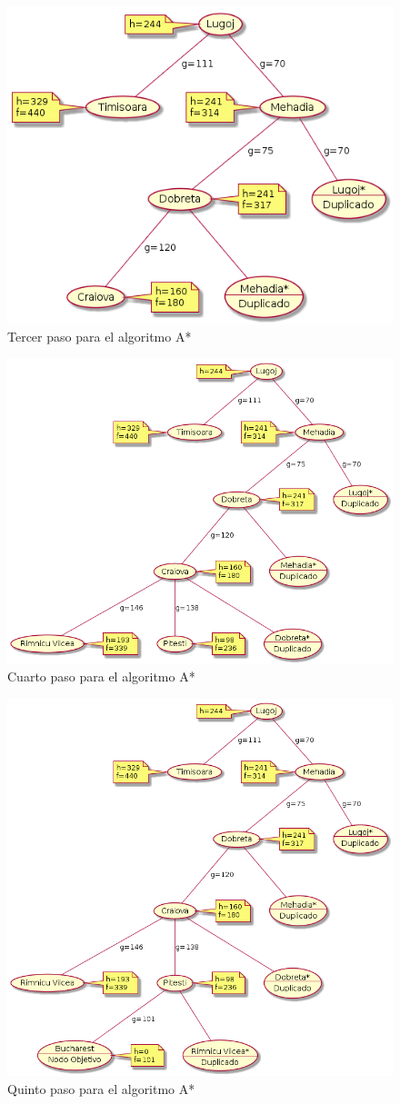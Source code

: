 \documentclass{article}
\begin{document}
\begin{figure}[H]
  \centering
  \includegraphics[width=.4\linewidth]{EJ2/As_002.png}
  \caption{Tercer paso para el algoritmo A*}
\end{figure}

\begin{figure}[H]
  \centering
  \includegraphics[width=.4\linewidth]{EJ2/As_003.png}
  \caption{Cuarto paso para el algoritmo A*}
\end{figure}

\begin{figure}[H]
  \centering
  \includegraphics[width=.4\linewidth]{EJ2/As_004.png}
  \caption{Quinto paso para el algoritmo A*}
\end{figure}
\end{document}
